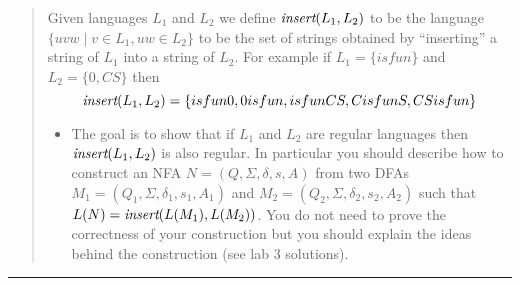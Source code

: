 \documentclass[11pt]{article}
\begin{document}


\begin{quote}

\item Given languages $L_1$ and $L_2$ we define $\text{\em insert}(L_1,L_2)$
to be the language $\{uvw \mid v \in L_1, uw \in L_2\}$ to be the
set of strings obtained by ``inserting'' a string of $L_1$ into a
string of $L_2$. For example if $L_1 = \{isfun\}$ and $L_2 = \{0, CS\}$
then
$$\text{\em insert}(L_1,L_2) = \{isfun0,0isfun,isfunCS,CisfunS,CSisfun\}$$
\begin{itemize}
\item The goal is to show that if $L_1$ and $L_2$ are regular
  languages then $\text{\em insert}(L_1,L_2)$ is also regular.  In
  particular you should describe how to construct an NFA $N =
  (Q,\Sigma, \delta,s, A)$ from two DFAs
  $M_1=(Q_1,\Sigma,\delta_1,s_1,A_1)$ and
  $M_2=(Q_2,\Sigma,\delta_2,s_2,A_2)$ such that $L(N) = \text{\em
    insert}(L(M_1),L(M_2))$. You do not need to prove the correctness of
  your construction but you should explain the ideas behind the
  construction (see lab 3 solutions).
\end{itemize}
\end{quote}
\hrule
\end{document}
